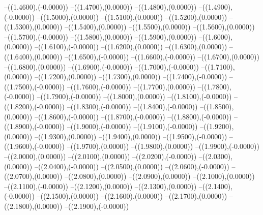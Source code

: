 {	--({\sx*(1.4600)},{\sy*(-0.0000)})
	--({\sx*(1.4700)},{\sy*(0.0000)})
	--({\sx*(1.4800)},{\sy*(0.0000)})
	--({\sx*(1.4900)},{\sy*(-0.0000)})
	--({\sx*(1.5000)},{\sy*(0.0000)})
	--({\sx*(1.5100)},{\sy*(0.0000)})
	--({\sx*(1.5200)},{\sy*(0.0000)})
	--({\sx*(1.5300)},{\sy*(0.0000)})
	--({\sx*(1.5400)},{\sy*(0.0000)})
	--({\sx*(1.5500)},{\sy*(0.0000)})
	--({\sx*(1.5600)},{\sy*(0.0000)})
	--({\sx*(1.5700)},{\sy*(-0.0000)})
	--({\sx*(1.5800)},{\sy*(0.0000)})
	--({\sx*(1.5900)},{\sy*(0.0000)})
	--({\sx*(1.6000)},{\sy*(0.0000)})
	--({\sx*(1.6100)},{\sy*(-0.0000)})
	--({\sx*(1.6200)},{\sy*(0.0000)})
	--({\sx*(1.6300)},{\sy*(0.0000)})
	--({\sx*(1.6400)},{\sy*(0.0000)})
	--({\sx*(1.6500)},{\sy*(-0.0000)})
	--({\sx*(1.6600)},{\sy*(-0.0000)})
	--({\sx*(1.6700)},{\sy*(0.0000)})
	--({\sx*(1.6800)},{\sy*(0.0000)})
	--({\sx*(1.6900)},{\sy*(-0.0000)})
	--({\sx*(1.7000)},{\sy*(-0.0000)})
	--({\sx*(1.7100)},{\sy*(0.0000)})
	--({\sx*(1.7200)},{\sy*(0.0000)})
	--({\sx*(1.7300)},{\sy*(0.0000)})
	--({\sx*(1.7400)},{\sy*(-0.0000)})
	--({\sx*(1.7500)},{\sy*(-0.0000)})
	--({\sx*(1.7600)},{\sy*(-0.0000)})
	--({\sx*(1.7700)},{\sy*(0.0000)})
	--({\sx*(1.7800)},{\sy*(-0.0000)})
	--({\sx*(1.7900)},{\sy*(-0.0000)})
	--({\sx*(1.8000)},{\sy*(0.0000)})
	--({\sx*(1.8100)},{\sy*(-0.0000)})
	--({\sx*(1.8200)},{\sy*(-0.0000)})
	--({\sx*(1.8300)},{\sy*(-0.0000)})
	--({\sx*(1.8400)},{\sy*(-0.0000)})
	--({\sx*(1.8500)},{\sy*(0.0000)})
	--({\sx*(1.8600)},{\sy*(-0.0000)})
	--({\sx*(1.8700)},{\sy*(-0.0000)})
	--({\sx*(1.8800)},{\sy*(-0.0000)})
	--({\sx*(1.8900)},{\sy*(-0.0000)})
	--({\sx*(1.9000)},{\sy*(-0.0000)})
	--({\sx*(1.9100)},{\sy*(-0.0000)})
	--({\sx*(1.9200)},{\sy*(0.0000)})
	--({\sx*(1.9300)},{\sy*(0.0000)})
	--({\sx*(1.9400)},{\sy*(0.0000)})
	--({\sx*(1.9500)},{\sy*(-0.0000)})
	--({\sx*(1.9600)},{\sy*(-0.0000)})
	--({\sx*(1.9700)},{\sy*(0.0000)})
	--({\sx*(1.9800)},{\sy*(0.0000)})
	--({\sx*(1.9900)},{\sy*(-0.0000)})
	--({\sx*(2.0000)},{\sy*(0.0000)})
	--({\sx*(2.0100)},{\sy*(0.0000)})
	--({\sx*(2.0200)},{\sy*(-0.0000)})
	--({\sx*(2.0300)},{\sy*(0.0000)})
	--({\sx*(2.0400)},{\sy*(-0.0000)})
	--({\sx*(2.0500)},{\sy*(0.0000)})
	--({\sx*(2.0600)},{\sy*(-0.0000)})
	--({\sx*(2.0700)},{\sy*(0.0000)})
	--({\sx*(2.0800)},{\sy*(0.0000)})
	--({\sx*(2.0900)},{\sy*(0.0000)})
	--({\sx*(2.1000)},{\sy*(0.0000)})
	--({\sx*(2.1100)},{\sy*(-0.0000)})
	--({\sx*(2.1200)},{\sy*(0.0000)})
	--({\sx*(2.1300)},{\sy*(0.0000)})
	--({\sx*(2.1400)},{\sy*(-0.0000)})
	--({\sx*(2.1500)},{\sy*(0.0000)})
	--({\sx*(2.1600)},{\sy*(0.0000)})
	--({\sx*(2.1700)},{\sy*(0.0000)})
	--({\sx*(2.1800)},{\sy*(0.0000)})
	--({\sx*(2.1900)},{\sy*(-0.0000)})
}
